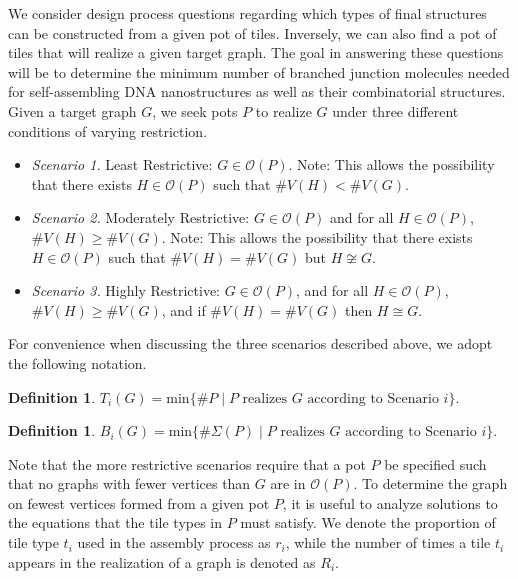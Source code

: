 \documentclass{elsarticle}
\theoremstyle{definition}
\newtheorem{definition}[theorem]{Definition}
\theoremstyle{remark}
\theoremstyle{plain}
\theoremstyle{plain}
\begin{document}
We consider design process questions regarding which types of final structures can be constructed from a given pot of tiles. Inversely, we can also find a pot of tiles that will realize a given target graph. The goal in answering these questions will be to determine the minimum number of branched junction molecules needed for self-assembling DNA nanostructures as well as their combinatorial structures. Given a target graph $G$, we seek pots $P$ to realize $G$ under three different conditions of varying restriction. 
\begin{itemize}
    \item \emph{Scenario 1.} Least Restrictive: $G \in \mathcal{O}(P)$. Note: This allows the possibility that there exists $H \in \mathcal{O}(P)$ such that $\#V(H) < \#V(G)$. 
    \item \emph{Scenario 2.} Moderately Restrictive: $G \in \mathcal{O}(P)$ and for all $H \in \mathcal{O}(P)$, $\#V(H)\geq \#V(G)$. Note: This allows the possibility that there exists $H \in \mathcal{O}(P)$ such that $\#V(H)=\#V(G)$ but $H \not \cong G$. 
    \item \emph{Scenario 3.} Highly Restrictive: $G \in \mathcal{O}(P)$, and for all $H \in \mathcal{O}(P)$, $\#V(H)\geq\#V(G)$, and if $\#V(H)=\#V(G)$ then $H \cong G$.
\end{itemize} 

For convenience when discussing the three scenarios described above, we adopt the following notation.

\begin{definition}
$T_i(G) = \text{min}\{ \#P \mid P \text{ realizes } G \text{ according to Scenario } i\}$.
\end{definition}

\begin{definition}
$B_i(G) = \text{min}\{ \# \Sigma (P) \mid P \text{ realizes } G \text{ according to Scenario } i\}$.
\end{definition}

 Note that the more restrictive scenarios require that a pot $P$ be specified such that no graphs with fewer vertices than $G$ are in $\mathcal{O}(P)$. To determine the graph on fewest vertices formed from a given pot $P$, it is useful to analyze solutions to the equations that the tile types in $P$ must satisfy. We denote the proportion of tile type $t_i$ used in the assembly process as $r_i$, while the number of times a tile $t_i$ appears in the realization of a graph is denoted as $R_i$.
\end{document}
